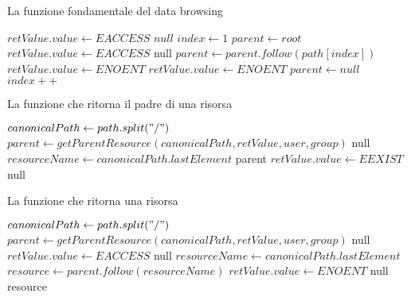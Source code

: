 \begin{algorithm}
\caption{La funzione fondamentale del data browsing}
\begin{algorithmic}[5]
		\State $retValue.value \gets EACCESS$
		\State \Return $null$
	\EndIf
	\State $index \gets 1$
	\State $parent \gets root$
			\State $retValue.value \gets EACCESS$
			\State \Return null
		\EndIf
		\State $parent \gets parent.follow(path[index])$
			\State $retValue.value \gets ENOENT$
			\State $retValue.value \gets ENOENT$
			\State $parent \gets null$
		\EndIf
		\State $index++$
	\EndWhile
\EndFunction
\end{algorithmic}
\end{algorithm}
\begin{algorithm}
\caption{La funzione che ritorna il padre di una risorsa}
\begin{algorithmic}[5]
	\State $canonicalPath \gets path.split("/")$
	\State $parent \gets getParentResource(canonicalPath, retValue, user, group)$
		\State \Return null
	\EndIf
	\State $resourceName \gets canonicalPath.lastElement$
		\State \Return parent
	\EndIf
	\State $retValue.value \gets EEXIST$
	\State \Return null
\EndFunction
\end{algorithmic}
\end{algorithm}
\begin{algorithm}
\begin{algorithmic}[5]
\caption{La funzione che ritorna una risorsa}
	\State $canonicalPath \gets path.split("/")$
	\State $parent \gets getParentResource(canonicalPath, retValue, user, group)$
		\State \Return null
	\EndIf
	\State $retValue.value \gets EACCESS$
		\State \Return null
	\EndIf
	\State $resourceName \gets canonicalPath.lastElement$
	\State $resource \gets parent.follow(resourceName)$
		\State $retValue.value \gets ENOENT$
		\State \Return null
	\EndIf
	\State \Return resource
\EndFunction
\end{algorithmic}
\end{algorithm}

\newpage

